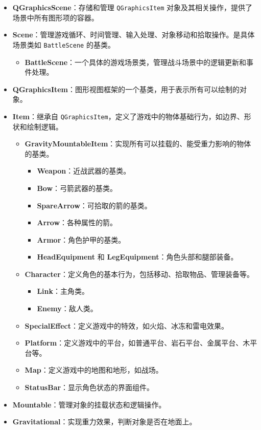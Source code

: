 \documentclass[UTF8]{ctexart}
\begin{document}
\begin{itemize}
    \item \textbf{QGraphicsScene}：存储和管理 \texttt{QGraphicsItem} 对象及其相关操作，提供了场景中所有图形项的容器。
    \item \textbf{Scene}：管理游戏循环、时间管理、输入处理、对象移动和拾取操作。是具体场景类如 \texttt{BattleScene} 的基类。
    \begin{itemize}
        \item \textbf{BattleScene}：一个具体的游戏场景类，管理战斗场景中的逻辑更新和事件处理。
    \end{itemize}
    \item \textbf{QGraphicsItem}：图形视图框架的一个基类，用于表示所有可以绘制的对象。
    \item \textbf{Item}：继承自 \texttt{QGraphicsItem}，定义了游戏中的物体基础行为，如边界、形状和绘制逻辑。
    \begin{itemize}
        \item \textbf{GravityMountableItem}：实现所有可以挂载的、能受重力影响的物体的基类。
        \begin{itemize}
            \item \textbf{Weapon}：近战武器的基类。
            \item \textbf{Bow}：弓箭武器的基类。
            \item \textbf{SpareArrow}：可拾取的箭的基类。
            \item \textbf{Arrow}：各种属性的箭。
            \item \textbf{Armor}：角色护甲的基类。
            \item \textbf{HeadEquipment} 和 \textbf{LegEquipment}：角色头部和腿部装备。
        \end{itemize}
        \item \textbf{Character}：定义角色的基本行为，包括移动、拾取物品、管理装备等。
        \begin{itemize}
            \item \textbf{Link}：主角类。
            \item \textbf{Enemy}：敌人类。
        \end{itemize}
        \item \textbf{SpecialEffect}：定义游戏中的特效，如火焰、冰冻和雷电效果。
        \item \textbf{Platform}：定义游戏中的平台，如普通平台、岩石平台、金属平台、木平台等。
        \item \textbf{Map}：定义游戏中的地图和地形，如战场。
        \item \textbf{StatusBar}：显示角色状态的界面组件。
    \end{itemize}
    \item \textbf{Mountable}：管理对象的挂载状态和逻辑操作。
    \item \textbf{Gravitational}：实现重力效果，判断对象是否在地面上。
\end{itemize}
\end{document}

